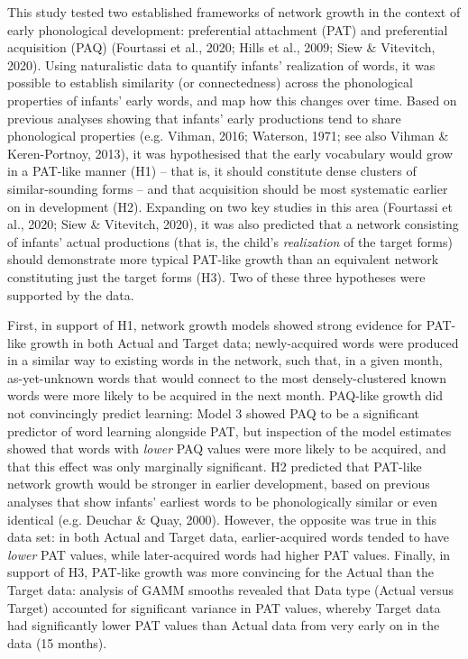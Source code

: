 \documentclass[
  man,mask,floatsintext]{apa6}
\begin{document}
This study tested two established frameworks of network growth in the context of early phonological development: preferential attachment (PAT) and preferential acquisition (PAQ) (Fourtassi et al., 2020; Hills et al., 2009; Siew \& Vitevitch, 2020). Using naturalistic data to quantify infants' realization of words, it was possible to establish similarity (or connectedness) across the phonological properties of infants' early words, and map how this changes over time. Based on previous analyses showing that infants' early productions tend to share phonological properties (e.g. Vihman, 2016; Waterson, 1971; see also Vihman \& Keren-Portnoy, 2013), it was hypothesised that the early vocabulary would grow in a PAT-like manner (H1) -- that is, it should constitute dense clusters of similar-sounding forms -- and that acquisition should be most systematic earlier on in development (H2). Expanding on two key studies in this area (Fourtassi et al., 2020; Siew \& Vitevitch, 2020), it was also predicted that a network consisting of infants' actual productions (that is, the child's \emph{realization} of the target forms) should demonstrate more typical PAT-like growth than an equivalent network constituting just the target forms (H3). Two of these three hypotheses were supported by the data.

First, in support of H1, network growth models showed strong evidence for PAT-like growth in both Actual and Target data; newly-acquired words were produced in a similar way to existing words in the network, such that, in a given month, as-yet-unknown words that would connect to the most densely-clustered known words were more likely to be acquired in the next month. PAQ-like growth did not convincingly predict learning: Model 3 showed PAQ to be a significant predictor of word learning alongside PAT, but inspection of the model estimates showed that words with \emph{lower} PAQ values were more likely to be acquired, and that this effect was only marginally significant. H2 predicted that PAT-like network growth would be stronger in earlier development, based on previous analyses that show infants' earliest words to be phonologically similar or even identical (e.g. Deuchar \& Quay, 2000). However, the opposite was true in this data set: in both Actual and Target data, earlier-acquired words tended to have \emph{lower} PAT values, while later-acquired words had higher PAT values. Finally, in support of H3, PAT-like growth was more convincing for the Actual than the Target data: analysis of GAMM smooths revealed that Data type (Actual versus Target) accounted for significant variance in PAT values, whereby Target data had significantly lower PAT values than Actual data from very early on in the data (15 months).
\end{document}
